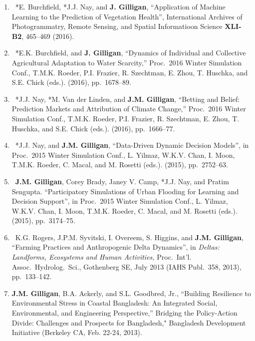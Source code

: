 %
%
\begin{enumerate}
%
    \item
    \textdagger\
    *E. Burchfield, *J.J. Nay, and \textbf{J. Gilligan},
    \enquote{Application of Machine Learning to the Prediction of Vegetation Health},
    International Archives of Photogrammatry, Remote Sensing, and Spatial Informatioon Science \textbf{XLI-B2}, 465--469 (2016).
%
    \item
    \textdagger\
    *E.K. Burchfield, and \textbf{J. Gilligan},
    \enquote{Dynamics of Individual and Collective Agricultural Adaptation to Water Scarcity,}
    Proc.\ 2016 Winter Simulation Conf., T.M.K. Roeder, P.I. Frazier, R. Szechtman, E. Zhou, T. Huschka, and S.E. Chick (eds.).
    (2016), pp.~1678--89.
%
    \item
    \textdagger\
    *J.J. Nay, *M. Van der Linden, and \textbf{J.M. Gilligan},
    \enquote{Betting and Belief: Prediction Markets and Attribution of Climate Change,}
    Proc.\ 2016 Winter Simulation Conf., T.M.K. Roeder, P.I. Frazier, R. Szechtman, E. Zhou, T. Huschka, and S.E. Chick (eds.).
    (2016), pp.~1666--77.
%
    \item 
    \textdagger\
    *J.J. Nay, and \textbf{J.M. Gilligan},
    \enquote{Data-Driven Dynamic Decision Models}, 
    in Proc.\ 2015 Winter Simulation Conf., L. Yilmaz, W.K.V. Chan, I. Moon, T.M.K. Roeder, C. Macal, and M. Rosetti (eds.). 
      (2015), pp.~2752--63. 
%
    \item 
    \textdagger\
    \textbf{J.M. Gilligan}, Corey Brady, Janey V. Camp, *J.J. Nay, and Pratim Sengupta.
    \enquote{Participatory Simulations of Urban Flooding for Learning and Decision Support}, 
    in Proc.\ 2015 Winter Simulation Conf., L. Yilmaz, W.K.V. Chan, I. Moon, T.M.K. Roeder, C. Macal, and M. Rosetti (eds.). 
      (2015), pp.~3174--75.
%
    \item 
    \textdagger\
    K.G. Rogers, J.P.M. Syvitski, I. Overeem, S. Higgins, and \textbf{J.M. Gilligan},
    \enquote{Farming Practices and Anthropogenic Delta Dynamics}, 
    in \emph{Deltas: Landforms, Ecosystems and Human Activities,} Proc.\ Int'l. Assoc.\ Hydrolog.\ Sci., Gothenberg SE, July 2013 (IAHS Publ.\ 358, 2013), pp.~133--142.
%
    \item
    \textbf{J.M. Gilligan}, B.A. Ackerly, and S.L. Goodbred, Jr., 
    \enquote{Building Resilience to Environmental Stress in Coastal Bangladesh: An Integrated Social, Environmental, and Engineering Perspective,} 
    Bridging the Policy-Action Divide: Challenges and Prospects for Bangladesh," Bangladesh Development Initiative (Berkeley CA, Feb. 22-24, 2013).

\end{enumerate}
